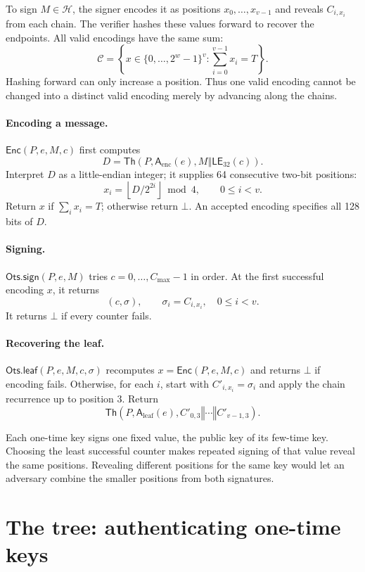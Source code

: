 \documentclass[11pt]{article}
\theoremstyle{plain}
\theoremstyle{definition}
\newcommand{\Th}{\mathsf{Th}}
\newcommand{\Enc}{\mathsf{Enc}}
\newcommand{\LE}{\mathsf{LE}}
\newcommand{\concat}{\mathbin\Vert}
\newcommand{\addr}{\mathsf{A}}
\newcommand{\cmax}{C_{\max}}
\newcommand{\OtsSign}{\mathsf{Ots.sign}}
\newcommand{\OtsLeaf}{\mathsf{Ots.leaf}}
\begin{document}
To sign $M\in\mathcal H$, the signer encodes it as positions $x_0,\ldots,x_{v-1}$ and reveals $C_{i,x_i}$ from each chain. The verifier hashes these values forward to recover the endpoints. All valid encodings have the same sum:
\[
  \mathcal C=\left\{x\in\{0,\ldots,2^w-1\}^{v}:\sum_{i=0}^{v-1}x_i=T\right\}.
\]
Hashing forward can only increase a position. Thus one valid encoding cannot be changed into a distinct valid encoding merely by advancing along the chains.

\paragraph{Encoding a message.}
$\Enc(P,e,M,c)$ first computes
\[
  D=\Th\!\left(P,\addr_{\mathrm{enc}}(e),M\concat\LE_{32}(c)\right).
\]
Interpret $D$ as a little-endian integer; it supplies 64 consecutive two-bit positions:
\[
  x_i=\left\lfloor D/2^{2i}\right\rfloor\bmod 4,\qquad 0\leq i<v.
\]
Return $x$ if $\sum_i x_i=T$; otherwise return $\bot$. An accepted encoding specifies all 128 bits of $D$.

\paragraph{Signing.}
$\OtsSign(P,e,M)$ tries $c=0,\ldots,\cmax-1$ in order. At the first successful encoding $x$, it returns
\[
  (c,\sigma),\qquad \sigma_i=C_{i,x_i},\quad 0\leq i<v.
\]
It returns $\bot$ if every counter fails.

\paragraph{Recovering the leaf.}
$\OtsLeaf(P,e,M,c,\sigma)$ recomputes $x=\Enc(P,e,M,c)$ and returns $\bot$ if encoding fails. Otherwise, for each $i$, start with $C'_{i,x_i}=\sigma_i$ and apply the chain recurrence up to position $3$. Return
\[
  \Th\!\left(P,\addr_{\mathrm{leaf}}(e),C'_{0,3}\concat\cdots\concat C'_{v-1,3}\right).
\]

\label{rem:once}
Each one-time key signs one fixed value, the public key of its few-time key. Choosing the least successful counter makes repeated signing of that value reveal the same positions. Revealing different positions for the same key would let an adversary combine the smaller positions from both signatures.

\section{The tree: authenticating one-time keys}
\label{sec:layer}
\end{document}
